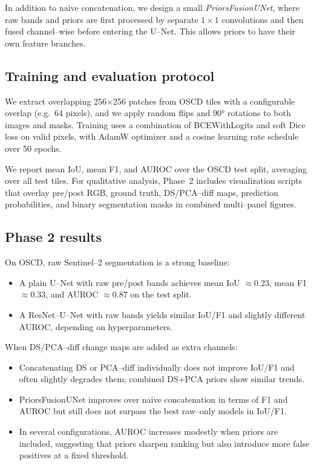 \documentclass[twoside,11pt]{article}
\begin{document}
In addition to naive concatenation, we design a small
\emph{PriorsFusionUNet}, where raw bands and priors are first processed by
separate \(1\times 1\) convolutions and then fused channel--wise before
entering the U--Net. This allows priors to have their own feature branches.

\subsection{Training and evaluation protocol}

We extract overlapping 256\(\times\)256 patches from OSCD tiles with a
configurable overlap (e.g.\ 64 pixels), and we apply random flips and 90°
rotations to both images and masks. Training uses a combination of
BCEWithLogits and soft Dice loss on valid pixels, with AdamW optimizer and a
cosine learning rate schedule over 50 epochs.

We report mean IoU, mean F1, and AUROC over the OSCD test split, averaging
over all test tiles. For qualitative analysis, Phase~2 includes visualization
scripts that overlay pre/post RGB, ground truth, DS/PCA--diff maps, prediction
probabilities, and binary segmentation masks in combined multi--panel figures.

\subsection{Phase 2 results}

On OSCD, raw Sentinel--2 segmentation is a strong baseline:
\begin{itemize}
  \item A plain U--Net with raw pre/post bands achieves mean IoU
  \(\approx 0.23\), mean F1 \(\approx 0.33\), and AUROC \(\approx 0.87\) on the
  test split.
  \item A ResNet--U--Net with raw bands yields similar IoU/F1 and slightly
  different AUROC, depending on hyperparameters.
\end{itemize}

When DS/PCA--diff change maps are added as extra channels:
\begin{itemize}
  \item Concatenating DS or PCA--diff individually does not improve IoU/F1 and
  often slightly degrades them; combined DS+PCA priors show similar trends.
  \item PriorsFusionUNet improves over naive concatenation in terms of F1 and
  AUROC but still does not surpass the best raw--only models in IoU/F1.
  \item In several configurations, AUROC increases modestly when priors are
  included, suggesting that priors sharpen ranking but also introduce more
  false positives at a fixed threshold.
\end{itemize}
\end{document}
